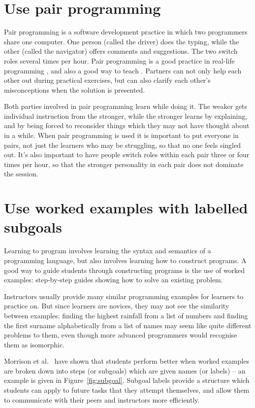 \documentclass[10pt,letterpaper]{article}
\newcommand{\rulemajor}[2]{\section{#1}\label{#2}}
\begin{document}
\rulemajor{Use pair programming}{pair-programming}

Pair programming is a software development practice
in which two programmers share one computer.
One person (called the driver) does the typing,
while the other (called the navigator) offers comments and suggestions.
The two switch roles several times per hour.
Pair programming is a good practice in real-life programming \cite{hannay},
and also a good way to teach \cite{mcdowell}.
Partners can not only help each other out during practical exercises,
but can also clarify each other's misconceptions when the solution is presented.

Both parties involved in pair programming learn while doing it.
The weaker gets individual instruction from the stronger,
while the stronger learns by explaining,
and by being forced to reconsider things which they may not have thought about in a while.
When pair programming is used it is important to put everyone in pairs,
not just the learners who may be struggling,
so that no one feels singled out.
It's also important to have people switch roles within each pair three or four times per hour,
so that the stronger personality in each pair does not dominate the session.

\rulemajor{Use worked examples with labelled subgoals}{worked-examples}

Learning to program involves learning the syntax and semantics of a programming language,
but also involves learning how to construct programs.
A good way to guide students through constructing programs is the use of worked examples:
step-by-step guides showing how to solve an existing problem.

Instructors usually provide many similar programming examples for learners to practice on.
But since learners are novices,
they may not see the similarity between examples:
finding the highest rainfall from a list of numbers and
finding the first surname alphabetically from a list of names
may seem like quite different problems to them,
even though more advanced programmers would recognise them as isomorphic.

Morrison et al.~\cite{morrison-subgoals,morrison-parsons,margulieux} have shown that students perform better
when worked examples are broken down into steps (or subgoals)
which are given names (or labels) -- an example is given in Figure~\ref{fig:subgoal}.
Subgoal labels provide a structure which students can apply to future tasks that they attempt themselves,
and allow them to communicate with their peers and instructors more efficiently.
\end{document}
